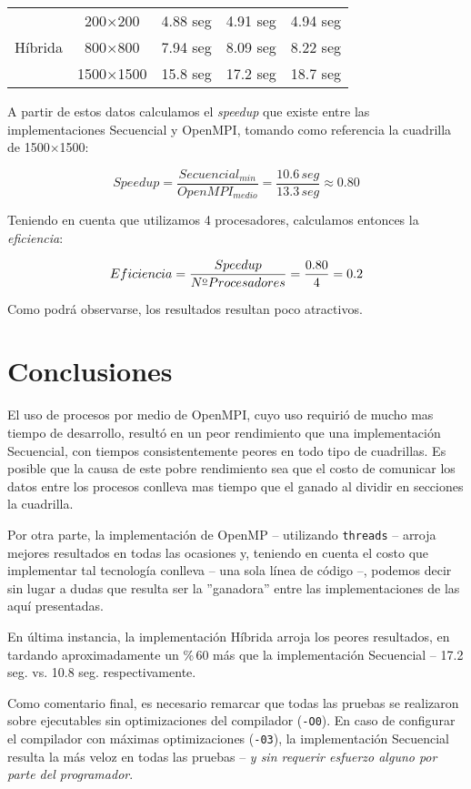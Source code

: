 \documentclass[a4paper,12pt]{article}
\begin{document}
\begin{table}[H]
\begin{center}
\begin{tabular}{|c|c|c|c|c|}
            \hline
            \multirow{3}{*}{Híbrida}                 & \multicolumn{1}{c|}{200$\times$200}   & 4.88 seg                              & 4.91 seg     & 4.94 seg      \\
                                                     & \multicolumn{1}{c|}{800$\times$800}   & 7.94 seg                              & 8.09 seg     & 8.22 seg      \\
                                                     & \multicolumn{1}{c|}{1500$\times$1500} & 15.8 seg                              & 17.2 seg     & 18.7 seg      \\
            \hline
        \end{tabular}
    \end{center}
\end{table}

\endgroup

A partir de estos datos calculamos el \emph{speedup} que existe entre las implementaciones Secuencial y OpenMPI, tomando como referencia la cuadrilla de 1500$\times$1500:

\[ Speedup = \frac{Secuencial_{min}}{OpenMPI_{medio}} = \frac{10.6\,seg}{13.3\,seg} \approx 0.80 \]

Teniendo en cuenta que utilizamos 4 procesadores, calculamos entonces la \emph{eficiencia}:

\[ Eficiencia = \frac{Speedup}{{N\textsuperscript{\underline{o}}} Procesadores} = \frac{0.80}{4} = 0.2 \]

Como podrá observarse, los resultados resultan poco atractivos.

\section{Conclusiones}

El uso de procesos por medio de OpenMPI, cuyo uso requirió de mucho mas tiempo de desarrollo, resultó en un peor rendimiento que una implementación Secuencial, con tiempos consistentemente peores en todo tipo de cuadrillas. Es posible que la causa de este pobre rendimiento sea que el costo de comunicar los datos entre los procesos conlleva mas tiempo que el ganado al dividir en secciones la cuadrilla.

Por otra parte, la implementación de OpenMP -- utilizando \verb|threads| -- arroja mejores resultados en todas las ocasiones y, teniendo en cuenta el costo que implementar tal tecnología conlleva -- una sola línea de código --, podemos decir sin lugar a dudas que resulta ser la ''ganadora'' entre las implementaciones de las aquí presentadas.

En última instancia, la implementación Híbrida arroja los peores resultados, en tardando aproximadamente un \%\,60 más que la implementación Secuencial -- 17.2 seg. vs.  10.8 seg. respectivamente.

Como comentario final, es necesario remarcar que todas las pruebas se realizaron sobre ejecutables sin optimizaciones del compilador (\lstinline{-O0}). En caso de configurar el compilador con máximas optimizaciones (\lstinline{-03}), la implementación Secuencial resulta la más veloz en todas las pruebas -- \emph{y sin requerir esfuerzo alguno por parte del programador}.
\end{document}
